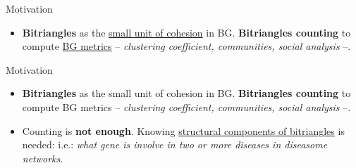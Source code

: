 \begin{frame}[fragile]{Motivation}
  \begin{itemize}
    \setlength\itemsep{1.5em}
    \item \textbf{Bitriangles} as the \underline{\color{red}small unit of cohesion} in BG. \textbf{Bitriangles counting} to compute \underline{\color{red}BG metrics} -- \emph{clustering coefficient, communities, social analysis} --.
  \end{itemize}
\end{frame}

\begin{frame}[fragile]{Motivation}
  \begin{itemize}
    \setlength\itemsep{1.5em}
    \item {\color{light}\textbf{Bitriangles} as the small unit of cohesion in BG. \textbf{Bitriangles counting} to compute BG metrics -- \emph{clustering coefficient, communities, social analysis} --.}
    \item Counting is \textbf{not enough}. Knowing \underline{\color{red}structural components of bitriangles} is needed: i.e.: \emph{what gene is involve in two or more diseases in diseasome networks}.
  \end{itemize}
\end{frame}

